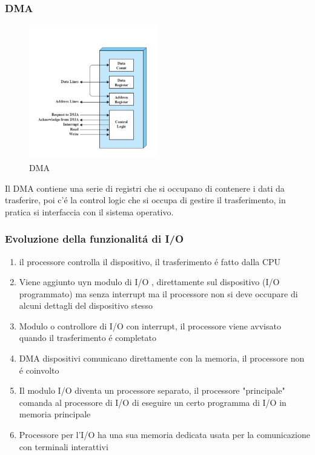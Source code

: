 \subsubsection*{DMA}
\begin{figure}
    \centering
    \includegraphics[width=0.5\textwidth]{immagini/DMA}
    \caption{DMA}
\end{figure}
Il DMA contiene una serie di registri che si occupano di contenere i dati da trasferire, poi c'é la control logic
che si occupa di gestire il trasferimento, in pratica si interfaccia con il sistema operativo.
\subsubsection*{Evoluzione della funzionalitá di I/O}
\begin{enumerate}
    \item il processore controlla il dispositivo, il trasferimento é fatto dalla CPU
    \item Viene aggiunto uyn modulo di I/O , direttamente sul dispositivo (I/O programmato) ma senza interrupt ma il processore non si deve occupare di alcuni dettagli del dispositivo stesso
    \item Modulo o controllore di I/O con interrupt, il processore viene avvisato quando il trasferimento é completato
    \item DMA dispositivi comunicano direttamente con la memoria, il processore non é coinvolto
    \item Il modulo I/O diventa un processore separato, il processore "principale" comanda al processore di I/O di eseguire un certo programma di I/O in memoria principale
    \item Processore per l'I/O ha una sua memoria dedicata usata per la comunicazione con terminali interattivi
\end{enumerate}
